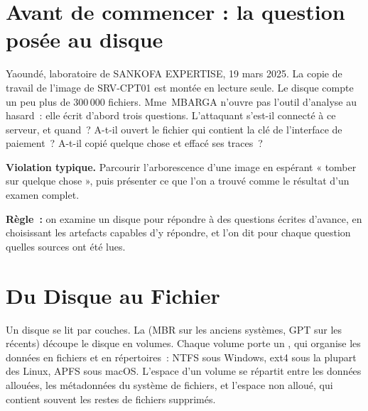 \section*{Avant de commencer : la question posée au disque}

Yaoundé, laboratoire de SANKOFA EXPERTISE, 19 mars 2025. La copie de travail
de l'image de SRV-CPT01 est montée en lecture seule. Le disque compte un peu
plus de 300\,000 fichiers. Mme~MBARGA n'ouvre pas l'outil d'analyse au
hasard~: elle écrit d'abord trois questions. L'attaquant s'est-il connecté à
ce serveur, et quand~? A-t-il ouvert le fichier qui contient la clé de
l'interface de paiement~? A-t-il copié quelque chose et effacé ses traces~?

\begin{boxalert}
\textbf{Violation typique.} Parcourir l'arborescence d'une image en
espérant « tomber sur quelque chose », puis présenter ce que l'on a trouvé
comme le résultat d'un examen complet.

\smallskip
\textbf{Règle~:} on examine un disque pour répondre à des questions écrites
d'avance, en choisissant les artefacts capables d'y répondre, et l'on dit
pour chaque question quelles sources ont été lues.
\end{boxalert}

\separateur

\section{Du Disque au Fichier}
\label{sec:c04-structure}

Un disque se lit par couches. La  (MBR sur les
anciens systèmes, GPT sur les récents) découpe le disque en volumes. Chaque
volume porte un , qui organise les données en
fichiers et en répertoires~: NTFS sous Windows, ext4 sous la plupart des
Linux, APFS sous macOS. L'espace d'un volume se répartit entre les données
allouées, les métadonnées du système de fichiers, et l'espace non alloué,
qui contient souvent les restes de fichiers supprimés.

